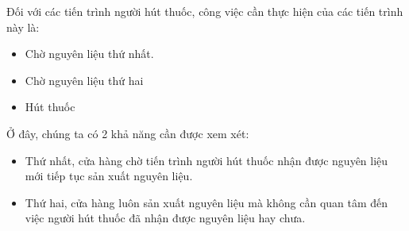 \noindent Đối với các tiến trình người hút thuốc, công việc cần thực hiện của các tiến trình này là: 
\begin{itemize}
    \item Chờ nguyên liệu thứ nhất.
    \item Chờ nguyên liệu thứ hai
    \item Hút thuốc
\end{itemize}
Ở đây, chúng ta có 2 khả năng cần được xem xét:
\begin{itemize}
    \item Thứ nhất, cửa hàng chờ tiến trình người hút thuốc nhận được nguyên liệu mới tiếp tục sản xuất nguyên liệu.
    \item Thứ hai, cửa hàng luôn sản xuất nguyên liệu mà không cần quan tâm đến việc người hút thuốc đã nhận được nguyên liệu hay chưa.
\end{itemize}


